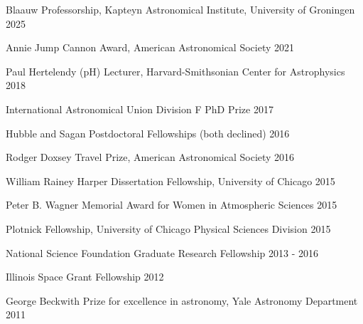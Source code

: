 \documentclass[12pt,letterpaper]{article}
\begin{document}
\begin{list}{}{\cvlist}
    \item Blaauw Professorship, Kapteyn Astronomical Institute, University of Groningen \hfill 2025
    \item Annie Jump Cannon Award, American Astronomical Society \hfill 2021
    \item Paul Hertelendy (pH) Lecturer, Harvard-Smithsonian Center for Astrophysics \hfill 2018 
    \item International Astronomical Union Division F PhD Prize \hfill 2017
    \item Hubble and Sagan Postdoctoral Fellowships (both declined) \hfill 2016
    \item Rodger Doxsey Travel Prize, American Astronomical Society \hfill 2016
    \item William Rainey Harper Dissertation Fellowship, University of Chicago \hfill 2015
    \item Peter B. Wagner Memorial Award for Women in Atmospheric Sciences \hfill 2015
    \item Plotnick Fellowship, University of Chicago Physical Sciences Division \hfill 2015
    \item National Science Foundation Graduate Research Fellowship \hfill 2013 - 2016
    \item Illinois Space Grant Fellowship \hfill 2012
    \item George Beckwith Prize for excellence in astronomy, Yale Astronomy Department \hfill2011
\end{list}

\end{document}
